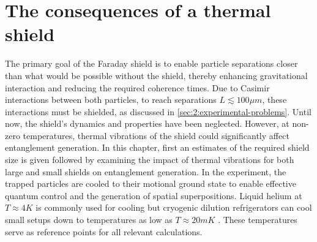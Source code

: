 \chapter{The consequences of a thermal shield}\label{cha:the-shield}
The primary goal of the Faraday shield is to enable particle separations closer than what would be possible without the shield, thereby enhancing gravitational interaction and reducing the required coherence times.
Due to Casimir interactions between both particles, to reach separations $L \lesssim 100\si{\mu m}$, these interactions must be shielded, as discussed in \cref{sec:2:experimental-problems}.
Until now, the shield's dynamics and properties have been neglected. However, at non-zero temperatures, thermal vibrations of the shield could significantly affect entanglement generation.
In this chapter, first an estimates of the required shield size is given followed by examining the impact of thermal vibrations for both large and small shields on entanglement generation.
In the experiment, the trapped particles are cooled to their motional ground state to enable effective quantum control and the generation of spatial superpositions.
Liquid helium at $T \approx 4\si{K}$ is commonly used for cooling but cryogenic dilution refrigerators can cool small setups down to temperatures as low as $T \approx 20\si{mK}$ \cite{Zu_2022}.
These temperatures serve as reference points for all relevant calculations.








